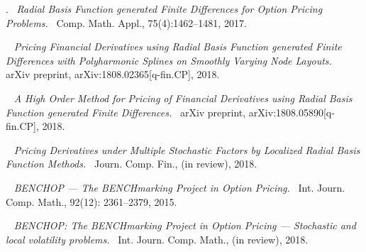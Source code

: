 \documentclass{UUThesisTemplate}
\begin{document}
\frontmatter
    \frontmatterCS

   \dedication{``These violent delights have violent ends.''\\(Romeo and Juliet: Act 2, Scene 6, Line 9)}

    \begin{listofpapers}
    \item
    .\ %
    \emph{Radial Basis Function generated Finite Differences for Option Pricing Problems.}\ %
    Comp. Math. Appl., 75(4):1462--1481, 2017. \label{paper1} %
    \item
    \ %
    \emph{Pricing Financial Derivatives using Radial Basis Function generated Finite Differences with Polyharmonic Splines on Smoothly Varying Node Layouts.}\ %
    arXiv preprint, arXiv:1808.02365[q-fin.CP], 2018. \label{paper2} %
    \item
    \ %
    \emph{A High Order Method for Pricing of Financial Derivatives using Radial Basis Function generated Finite Differences.}\ %
    arXiv preprint, arXiv:1808.05890[q-fin.CP], 2018. \label{paper3} %
    \item
    \ %
    \emph{Pricing Derivatives under Multiple Stochastic Factors by Localized Radial Basis Function Methods.}\ %
    Journ. Comp. Fin., (in review), 2018. \label{paper4} %
    \item
    \ %
    \emph{BENCHOP --- The BENCHmarking Project in Option Pricing.}\ %
    Int. Journ. Comp. Math., 92(12): 2361--2379, 2015. \label{paper5}
    \item
    \ %
    \emph{BENCHOP: The BENCHmarking Project in Option Pricing --- Stochastic and local volatility problems.}\ %
    Int. Journ. Comp. Math., (in review), 2018. \label{paper6}
    \end{listofpapers}
	
\end{document}
